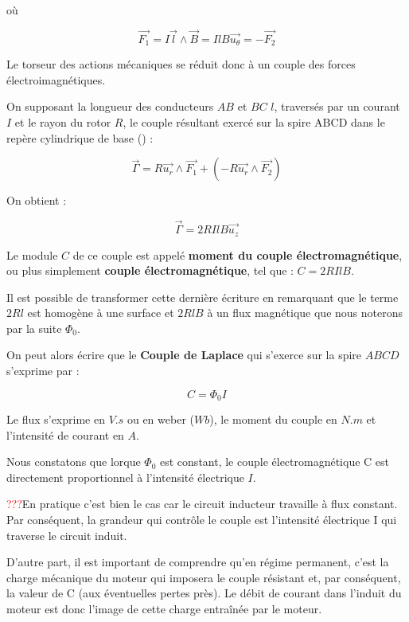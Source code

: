 \documentclass{article}
\begin{document}
où

\begin{equation}
    \Vec{F_1} = I\Vec{l} \land \vec{B} = IlB \vec{u_\theta} = -\vec{F_2}
\end{equation}

Le torseur des actions mécaniques se réduit donc à un couple des forces électroimagnétiques.\medskip

On supposant la longueur des conducteurs $AB$ et $BC$ $l$, traversés par un courant $I$ et le rayon du rotor $R$, le couple résultant exercé sur la spire ABCD dans le repère cylindrique de base () :

\begin{equation}
    \Vec{\Gamma} = R\Vec{u_r} \land \Vec{F_1} + (-R\Vec{u_r} \land \Vec{F_2})
\end{equation}

On obtient :

\begin{equation}
    \vec{\Gamma} = 2RIlB \vec{u_z}
\end{equation}

Le module $C$ de ce couple est appelé \textbf{moment du couple électromagnétique}, ou plus simplement \textbf{couple électromagnétique}, tel que : $C = 2RIlB$. \medskip


Il est possible de transformer cette dernière écriture en remarquant que le terme $2Rl$ est homogène à une surface et $2RlB$ à un flux magnétique que nous noterons par la suite $\Phi_0$.

On peut alors écrire que le \textbf{Couple de Laplace} qui s'exerce sur la spire $ABCD$ s'exprime par :

\begin{equation}
    C = \Phi_0 I
\end{equation}

Le flux s'exprime en $V.s$ ou en weber ($Wb$), le moment du couple en $N.m$ et l'intensité de courant en $A$.\medskip

Nous constatons que lorque $\Phi_0$ est constant, le couple électromagnétique C est directement proportionnel à l'intensité électrique $I$. \medskip

\textcolor{red}{???}En pratique c'est bien le cas car le circuit inducteur travaille à flux constant. Par conséquent, la grandeur qui contrôle le couple est l'intensité électrique I qui traverse le circuit induit.\medskip

D'autre part, il est important de comprendre qu'en régime permanent, c'est la charge mécanique du moteur qui imposera le couple résistant et, par conséquent, la valeur de C (aux éventuelles pertes près). Le débit de courant dans l'induit du moteur est donc l'image de cette charge entraînée par le moteur.\medskip
\end{document}
